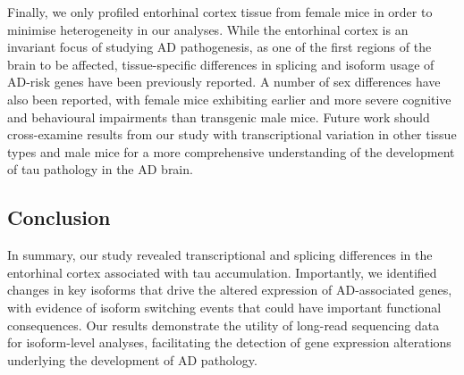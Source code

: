 Finally, we only profiled entorhinal cortex tissue from female mice in order to minimise heterogeneity in our analyses. While the entorhinal cortex is an invariant focus of studying AD pathogenesis, as one of the first regions of the brain to be affected, tissue-specific differences in splicing and isoform usage of AD-risk genes have been previously reported\cite{Monti2021}. A number of sex differences have also been reported, with female mice exhibiting earlier and more severe cognitive and behavioural impairments than transgenic male mice\cite{M2011}. Future work should cross-examine results from our study with transcriptional variation in other tissue types and male mice for a more comprehensive understanding of the development of tau pathology in the AD brain. 

\subsection{Conclusion}
In summary, our study revealed transcriptional and splicing differences in the entorhinal cortex associated with tau accumulation. Importantly, we identified changes in key isoforms that drive the altered expression of AD-associated genes, with evidence of isoform switching events that could have important functional consequences. Our results demonstrate the utility of long-read sequencing data for isoform-level analyses, facilitating the detection of gene expression alterations underlying the development of AD pathology. 